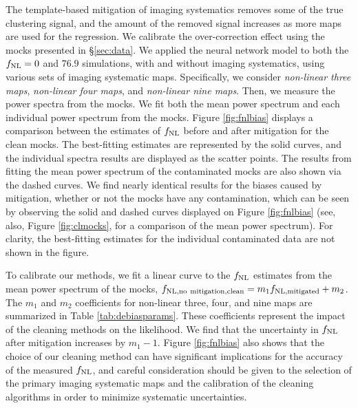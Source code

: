    The template-based mitigation of imaging systematics removes some of the true clustering signal, and the amount of the removed signal increases as more maps are used for the regression. We calibrate the over-correction effect using the mocks presented in \S \ref{sec:data}. We applied the neural network model to both the $f_{\rm NL}=0$ and $76.9$ simulations, with and without imaging systematics, using various sets of imaging systematic maps. Specifically, we consider \textit{non-linear three maps}, \textit{non-linear four maps}, and \textit{non-linear nine maps}. Then, we measure the power spectra from the mocks. We fit both the mean power spectrum and each individual power spectrum from the mocks. Figure \ref{fig:fnlbias} displays a comparison between the estimates of $f_{\rm NL}$ before and after mitigation for the clean mocks. The best-fitting estimates are represented by the solid curves, and the individual spectra results are displayed as the scatter points. The results from fitting the mean power spectrum of the contaminated mocks are also shown via the dashed curves. We find nearly identical results for the biases caused by mitigation, whether or not the mocks have any contamination, which can be seen by observing the solid and dashed curves displayed on Figure \ref{fig:fnlbias} (see, also, Figure \ref{fig:clmocks}, for a comparison of the mean power spectrum). For clarity, the best-fitting estimates for the individual contaminated data are not shown in the figure.

To calibrate our methods, we fit a linear curve to the $f_{\rm NL}$ estimates from the mean power spectrum of the mocks, $f_{\rm NL, no~mitigation, clean} = m_{1} f_{\rm NL, mitigated} + m_{2}$. The $m_{1}$ and $m_{2}$ coefficients for non-linear three, four, and nine maps are summarized in Table \ref{tab:debiasparams}. These coefficients represent the impact of the cleaning methods on the likelihood. We find that the uncertainty in $f_{\rm NL}$ after mitigation increases by $m_{1}-1$. Figure \ref{fig:fnlbias} also shows that the choice of our cleaning method can have significant implications for the accuracy of the measured $f_{\rm NL}$, and careful consideration should be given to the selection of the primary imaging systematic maps and the calibration of the cleaning algorithms in order to minimize systematic uncertainties.

